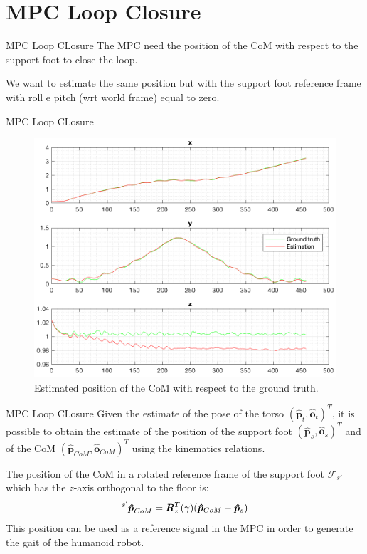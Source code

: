 \documentclass[10pt]{beamer}
\begin{document}
    \section{MPC Loop Closure}

    \begin{frame}{MPC Loop CLosure}
    	The MPC need the position of the CoM with respect to the support
        foot to close the loop.

    	We want to estimate the same position but with the support foot
        reference frame with roll e pitch (wrt world frame) equal to zero.
    \end{frame}

    \begin{frame}{MPC Loop CLosure}
    	\begin{figure}
            \caption{Estimated position of the CoM with respect to the
                ground truth.}
            \vspace{-0.3cm}
    	    \includegraphics[scale=0.5]{images/trilateration_com.png}
    	\end{figure}
    \end{frame}

    \begin{frame}{MPC Loop CLosure}
    	Given the estimate of the pose of the torso
        $(\bm{\hat{p}}_t, \bm{\hat{o}}_t)^T$,
        it is possible to obtain the estimate of the position of the support foot
        $(\bm{\hat{p}}_s, \bm{\hat{o}}_s)^T$  and of the CoM $(\bm{\hat{p}}_{CoM}, \bm{\hat{o}}_{CoM})^T$  using the kinematics relations.

        The position of the CoM in a rotated
        reference frame of the support foot $\mathcal{F}_{s'}$ which has the $z$-axis
        orthogonal to the floor is:
        \begin{equation*}
            \tensor[^{s'}]{\bm{\hat{p}}}{_{CoM}} = \bm{R}^{T}_{z}(\gamma)(\bm{\hat{p}}_{CoM}-\bm{\hat{p}}_{s})
        \end{equation*}
        This position can be used as a reference signal
        in the MPC in order to generate the gait of the humanoid robot.
    \end{frame}
\end{document}
